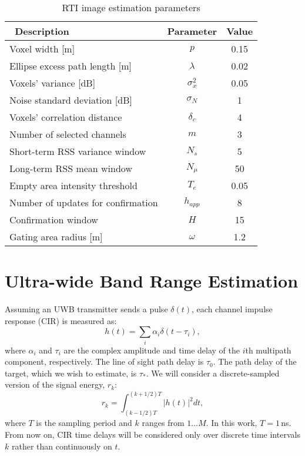 \documentclass[conference]{IEEEtran}
\begin{document}
\begin{table}[t!]
    \caption{RTI image estimation parameters} \centering
        \footnotesize
        \begin{tabular}{l c c} \hline\hline\          Description & Parameter & Value \\
        \hline  Voxel width [m]                    & $p$          & 0.15 \\
        Ellipse excess path length [m]     & $\lambda$    & 0.02 \\
        Voxels' variance [dB]              & $\sigma^2_{x}$ & 0.05 \\
        Noise standard deviation [dB]      & $\sigma_{N}$ & 1 \\
        Voxels' correlation distance       & $\delta_{c}$ & 4 \\
        Number of selected channels        & $m$          & 3 \\
        Short-term RSS variance window     & $N_s$        & 5 \\
        Long-term RSS mean window          & $N_{\mu}$    & 50 \\
        \hline  Empty area intensity threshold     & $T_e$        & 0.05 \\
        Number of updates for confirmation & $h_{app}$      & 8 \\
        Confirmation window                & $H$          & 15 \\
        Gating area radius [m]             & $\omega$     & 1.2  \\
        \hline \end{tabular}
        \label{T:RTIImageParameters}
\end{table}



\section{Ultra-wide Band Range Estimation} \label{sec:uwb}

Assuming an UWB transmitter sends a pulse $\delta(t)$, each channel
impulse response (CIR) is measured as:
\begin{equation}
h(t) = \sum_i \alpha_i \delta(t-\tau_i),
\end{equation}
where $\alpha_i$ and $\tau_i$ are the complex amplitude and time delay
of the $i$th multipath component, respectively. The line of sight path
delay is $\tau_0$. The path delay of the target, which we wish to
estimate, is $\tau_*$. We will consider a discrete-sampled version of
the signal energy, $r_k$:
\begin{equation} \label{E:r_k}
r_k = \int_{(k-1/2)T}^{{(k+1/2)T}} |h(t)|^2 dt,
\end{equation}
where $T$ is the sampling period and $k$ ranges from $1 \ldots M$. In
this work, $T=1$\,ns. From now on, CIR time delays will be considered
only over discrete time intervals $k$ rather than continuously on $t$.
\end{document}
